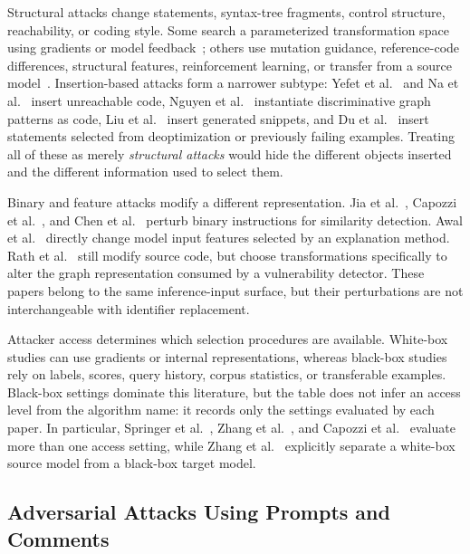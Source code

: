 \documentclass[acmsmall,screen,review]{acmart}
\begin{document}
Structural attacks change statements, syntax-tree fragments, control structure, reachability, or coding style. Some search a parameterized transformation space using gradients or model feedback~\cite{srikant2021generating,ramakrishnan2022semantic,zhang2022carrot}; others use mutation guidance, reference-code differences, structural features, reinforcement learning, or transfer from a source model~\cite{vahdatpour2021search,tian2023coda,zhang2023struck,rlattack2024,transfer2024coding}. Insertion-based attacks form a narrower subtype: Yefet et al.~\cite{yefet2020adversarial} and Na et al.~\cite{na2023dip} insert unreachable code, Nguyen et al.~\cite{nguyen2023graphcodeattack} instantiate discriminative graph patterns as code, Liu et al.~\cite{liu2024eatvul} insert generated snippets, and Du et al.~\cite{sloda2025} insert statements selected from deoptimization or previously failing examples. Treating all of these as merely \emph{structural attacks} would hide the different objects inserted and the different information used to select them.

Binary and feature attacks modify a different representation. Jia et al.~\cite{funcfooler2022}, Capozzi et al.~\cite{spatialgreedy2024}, and Chen et al.~\cite{explainerbcsd2025} perturb binary instructions for similarity detection. Awal et al.~\cite{explainability2025} directly change model input features selected by an explanation method. Rath et al.~\cite{natgvd2025} still modify source code, but choose transformations specifically to alter the graph representation consumed by a vulnerability detector. These papers belong to the same inference-input surface, but their perturbations are not interchangeable with identifier replacement.

Attacker access determines which selection procedures are available. White-box studies can use gradients or internal representations, whereas black-box studies rely on labels, scores, query history, corpus statistics, or transferable examples. Black-box settings dominate this literature, but the table does not infer an access level from the algorithm name: it records only the settings evaluated by each paper. In particular, Springer et al.~\cite{springer2020strata}, Zhang et al.~\cite{zhang2022carrot}, and Capozzi et al.~\cite{spatialgreedy2024} evaluate more than one access setting, while Zhang et al.~\cite{transfer2024coding} explicitly separate a white-box source model from a black-box target model.

\subsection{Adversarial Attacks Using Prompts and Comments}
\label{sec:evasion-prompt}
\end{document}
